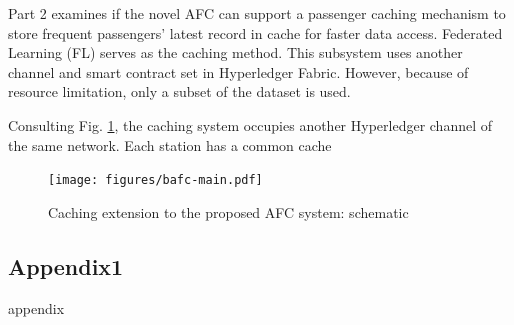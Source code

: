 \documentclass[a4paper,12pt,oneside, utf8x]{report}
\begin{document}
Part 2 examines if the novel AFC can support a passenger caching mechanism to store frequent passengers' latest record in cache for faster data access. Federated Learning (FL) serves as the caching method. This subsystem uses another channel and smart contract set in Hyperledger Fabric. However, because of resource limitation, only a subset of the dataset is used.

Consulting Fig. \ref{f33a}, the caching system occupies another Hyperledger channel of the same network. Each station has a common cache

    \begin{figure}[H]
        \centering
        \texttt{[image: figures/bafc-main.pdf]}
        \caption{Caching extension to the proposed AFC system: schematic}
        \label{f33a}
    \end{figure}







\printbibliography[heading=bibintoc,title={Bibliography}]
 
\begin{appendices}


    \chapter{Appendix1}
        \label{appx:label1}
        appendix
\end{appendices}
\end{document}
